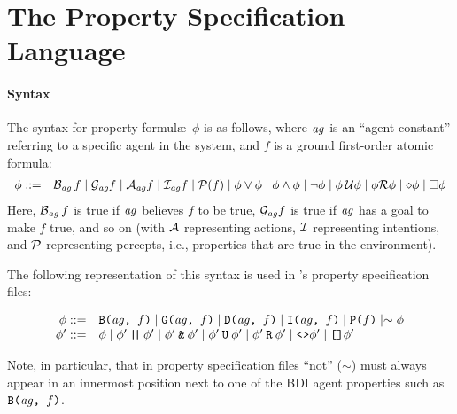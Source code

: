 \documentclass[a4]{article}
\begin{document}
\section{The Property Specification Language}

\paragraph{Syntax}
The syntax for property formul\ae\ $\phi$ is as follows, where
$\mathit{ag}$ is an ``agent constant'' referring to a specific agent in
the system, and $f$ is a ground first-order atomic formula:
%
\begin{equation*}
\begin{array}{rl}
\phi ::= & \mathrm{{\cal B}}_{\mathit{ag}} \, f \mid \mathrm{{\cal G}}_{\mathit{ag}} f \mid
  \mathrm{{\cal A}}_{\mathit{ag}} f \mid \mathrm{{\cal I}}_{\mathit{ag}} f \mid
  \mathrm{{\cal P}}(f)
  \mid \phi \vee \phi \mid \phi \wedge \phi \mid \neg \phi
   \mid \phi \: \mathcal{U} \phi \mid \phi \mathcal{R} \phi \mid \diamond \phi \mid \Box \phi
\end{array}
\end{equation*}
%
Here, $\mathrm{{\cal B}}_{\mathit{ag}} \, f$ is true if $\mathit{ag}$ believes
$f$ to be true, $\mathrm{{\cal G}}_{\mathit{ag}} f$ is true if $\mathit{ag}$ has a
goal to make $f$ true, and so on (with $\mathrm{{\cal A}}$ representing
actions, $\mathrm{{\cal I}}$ representing intentions, and $\mathrm{{\cal P}}$
representing percepts, i.e., properties that are true in the environment).

The following representation of this syntax is used in \ajpf's property specification files:

\begin{equation*}
\begin{array}{rl}
\phi ::= & \texttt{B(}\mathit{ag}\texttt{, }f\texttt{)} \mid 
\texttt{G(}\mathit{ag}\texttt{, }f\texttt{)} \mid 
\texttt{D(}\mathit{ag}\texttt{, }f\texttt{)} \mid 
\texttt{I(}\mathit{ag}\texttt{, }f\texttt{)} \mid 
\texttt{P(}f\texttt{)} \mid \sim \phi \\
\phi' ::= & \phi \mid 
  \phi' \: \texttt{|\!|} \: \phi' \mid 
  \phi' \: \texttt{\&} \: \phi' \mid 
   \phi' \: \texttt{U} \: \phi' \mid \phi' \: \texttt{R} \: \phi' \mid \texttt{<>} \phi' \mid \texttt{[]} \phi'
\end{array}
\end{equation*}

Note, in particular, that in property specification files ``not'' ($\sim$) must always appear in an innermost position next to one of the BDI agent properties such as $\texttt{B(}\mathit{ag}\texttt{, }f\texttt{)}$.  
\end{document}
